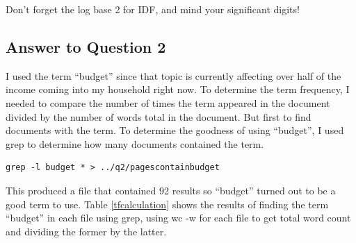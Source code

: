 \documentclass{article}
\begin{document}
Don't forget the log base 2 for IDF, and mind your significant digits!

\subsection*{Answer to Question 2}

I used the term ``budget'' since that topic is currently affecting over half of the income coming into my household right now. To determine the term frequency, I needed to compare the number of times the term appeared in the document divided by the number of words total in the document. But first to find documents with the term. To determine the goodness of using ``budget'', I used grep to determine how many documents contained the term.

\begin{verbatim}
grep -l budget * > ../q2/pagescontainbudget
\end{verbatim}

This produced a file that contained 92 results so ``budget'' turned out to be a good term to use. Table \ref{tfcalculation} shows the results of finding the term ``budget'' in each file using grep, using wc -w for each file to get total word count and dividing the former by the latter. \\
\end{document}

